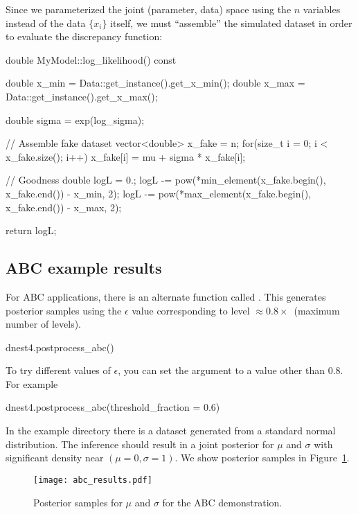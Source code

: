 \documentclass[article]{jss}
\begin{document}
Since we parameterized the joint (parameter, data) space using the
$n$ variables instead of the data $\{x_i\}$ itself, we must
``assemble'' the simulated dataset in order to evaluate the
discrepancy function:
%
\begin{CodeChunk}
\begin{CodeInput}
double MyModel::log_likelihood() const
{
    double x_min = Data::get_instance().get_x_min();
    double x_max = Data::get_instance().get_x_max();

    double sigma = exp(log_sigma);

    // Assemble fake dataset
    vector<double> x_fake = n;
    for(size_t i = 0; i < x_fake.size(); i++)
        x_fake[i] = mu + sigma * x_fake[i];

    // Goodness
    double logL = 0.;
    logL -= pow(*min_element(x_fake.begin(), x_fake.end()) - x_min, 2);
    logL -= pow(*max_element(x_fake.begin(), x_fake.end()) - x_max, 2);

    return logL;
}
\end{CodeInput}
\end{CodeChunk}
%
\subsection{ABC example results}
For ABC applications, there is an alternate  function
called .
This generates posterior samples using the $\epsilon$ value corresponding
to level $\approx 0.8\times$~(maximum number of levels).
%
\begin{CodeChunk}
\begin{CodeInput}
dnest4.postprocess_abc()
\end{CodeInput}
\end{CodeChunk}
%
To try different values of $\epsilon$, you can set the argument
 to a value other than 0.8. For example
%
\begin{CodeChunk}
\begin{CodeInput}
dnest4.postprocess_abc(threshold_fraction = 0.6)
\end{CodeInput}
\end{CodeChunk}
%
In the example directory there is a dataset generated from
a standard normal distribution. The inference should
result in a joint posterior for $\mu$ and $\sigma$ with
significant density near $(\mu=0, \sigma=1)$.
We show posterior samples in Figure~\ref{fig:abc_results}.
\begin{figure}[t!]
\centering
\texttt{[image: abc\_results.pdf]}
\caption{Posterior samples for $\mu$ and $\sigma$ for the
ABC demonstration.\label{fig:abc_results}}
\end{figure}
\end{document}

